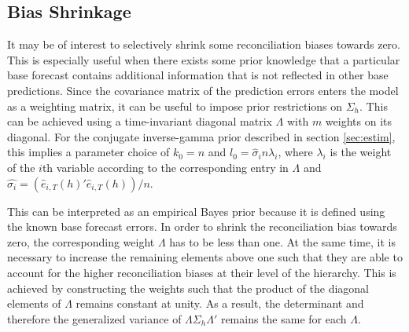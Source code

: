 \documentclass[a4paper,fleqn,11pt]{article}
\begin{document}
\subsection{Bias Shrinkage}\label{sec:weighting}
It may be of interest to selectively shrink some reconciliation biases towards zero. This is especially useful when there exists some prior knowledge that a particular base forecast contains additional information that is not reflected in other base predictions. Since the covariance matrix of the prediction errors enters the model as a weighting matrix, it can be useful to impose prior restrictions on $\Sigma_h$. This can be achieved using a time-invariant diagonal matrix $\Lambda$ with $m$ weights on its diagonal. For the conjugate inverse-gamma prior described in section \ref{sec:estim}, this implies a parameter choice of $k_0 = n $ and $l_0 = \hat{\sigma}_i n \lambda_i$, where $\lambda_i$ is the weight of the $i$th variable according to the corresponding entry in $\Lambda$ and $\hat{\sigma_i} = \left(\hat{e}_{i,T}(h)'\hat{e}_{i,T}(h)\right)/n$.

This can be interpreted as an empirical Bayes prior because it is defined using the known base forecast errors. In order to shrink the reconciliation bias towards zero, the corresponding weight $\Lambda$ has to be less than one. At the same time, it is necessary to increase the remaining elements above one such that they are able to account for the higher reconciliation biases at their level of the hierarchy. This is achieved by constructing the weights such that the product of the diagonal elements of $\Lambda$ remains constant at unity. As a result, the determinant and therefore the generalized variance of $\Lambda\Sigma_h\Lambda'$ remains the same for each $\Lambda$.
\end{document}
